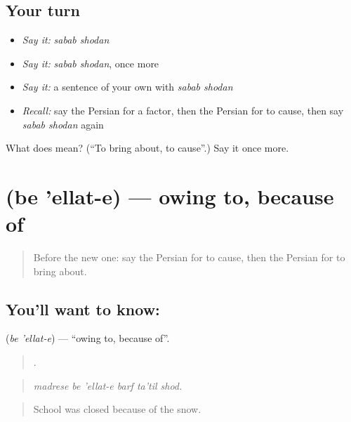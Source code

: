 \subsection*{Your turn}
\begin{itemize}
\raggedright
  \item \emph{Say it:} \emph{sabab shodan}
  \item \emph{Say it:} \emph{sabab shodan}, once more
  \item \emph{Say it:} a sentence of your own with \emph{sabab shodan}
  \item \emph{Recall:} say the Persian for a factor, then the Persian for to cause, then say \emph{sabab shodan} again
\end{itemize}

\begin{tcolorbox}[breakable,colback=teal!4,colframe=teal!35!black,title={Before you move on}]
What does   mean? (\textquotedblleft{}To bring about, to cause\textquotedblright{}.) Say it once more.
\end{tcolorbox}
\section[\texorpdfstring{\fa{به} \fa{علت} (be 'ellat-e)}{به علت (be 'ellat-e)}]{  (be 'ellat-e) — owing to, because of}

\label{lesson:FA-C369-be-ellat-e}



\begin{quote}
Before the new one: say the Persian for to cause, then the Persian for to bring about.
\end{quote}

\subsection*{You'll want to know:  }
\textbf{ } (\emph{be 'ellat-e}) — \textquotedblleft{}owing to, because of\textquotedblright{}.

\begin{quote}
     .
\end{quote}

\begin{quote}
\emph{madrese be 'ellat-e barf ta'til shod.}
\end{quote}

\begin{quote}
School was closed because of the snow.
\end{quote}

